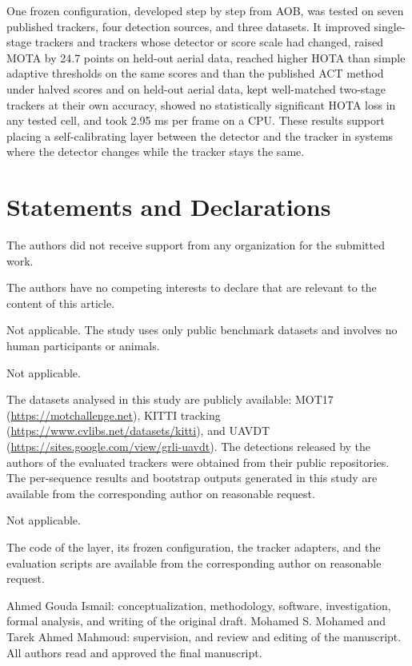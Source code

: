 \documentclass[pdflatex,sn-mathphys-num,iicol]{sn-jnl}
\newcommand{\aob}{AOB}
\begin{document}
One frozen configuration, developed step by step from \aob{}, was tested on
seven published trackers, four detection sources, and three datasets. It
improved single-stage trackers and trackers whose detector or score scale had
changed, raised MOTA by 24.7 points on held-out aerial data, reached higher HOTA than
simple adaptive thresholds on the same scores and than the published ACT
method under halved scores and on held-out aerial data, kept well-matched two-stage
trackers at their own accuracy, showed no statistically significant HOTA loss
in any tested cell, and took 2.95 ms per frame on a CPU. These results support placing a self-calibrating
layer between the detector and the tracker in systems where the detector
changes while the tracker stays the same.

\backmatter

\section*{Statements and Declarations}

The authors did not receive support from any organization for the submitted work.

The authors have no competing interests to declare that are relevant to the content of this
article.

Not applicable. The study uses only public benchmark datasets and involves no human participants
or animals.

Not applicable.

The datasets analysed in this study are publicly available: MOT17
(\url{https://motchallenge.net}), KITTI tracking (\url{https://www.cvlibs.net/datasets/kitti}), and UAVDT
(\url{https://sites.google.com/view/grli-uavdt}).
The detections released by the authors of the evaluated trackers were obtained from their public
repositories. The per-sequence results and bootstrap outputs generated in this study are available
from the corresponding author on reasonable request.

Not applicable.

The code of the layer, its frozen configuration, the tracker adapters, and the evaluation scripts
are available from the corresponding author on reasonable request.

Ahmed Gouda Ismail: conceptualization, methodology, software, investigation, formal analysis, and
writing of the original draft. Mohamed S. Mohamed and Tarek Ahmed Mahmoud: supervision, and
review and editing of the manuscript. All authors read and approved the final manuscript.
\end{document}
